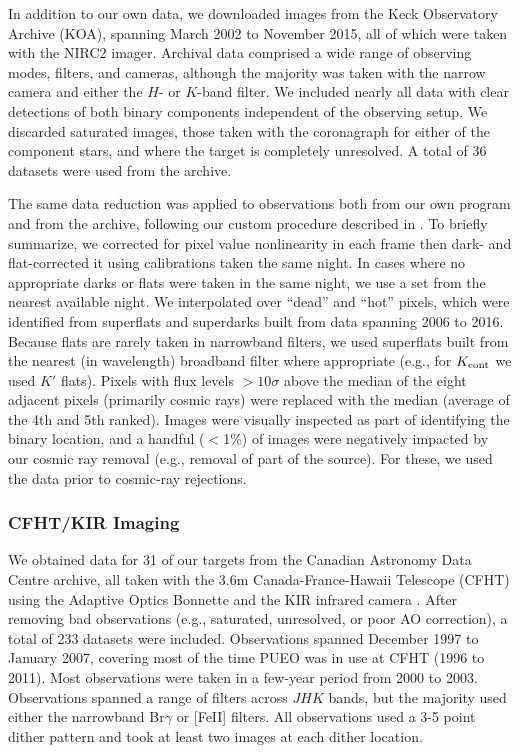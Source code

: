 \documentclass[twocolumn]{aastex62}
\begin{document}
In addition to our own data, we downloaded images from the Keck Observatory Archive (KOA), spanning March 2002 to November 2015, all of which were taken with the NIRC2 imager. Archival data comprised a wide range of observing modes, filters, and cameras, although the majority was taken with the narrow camera and either the $H$- or $K$-band filter. We included nearly all data with clear detections of both binary components independent of the observing setup. We discarded saturated images, those taken with the coronagraph for either of the component stars, and where the target is completely unresolved. A total of 36 datasets were used from the archive. 

The same data reduction was applied to observations both from our own program and from the archive, following our custom procedure described in \citet{Kraus2016a}. To briefly summarize, we corrected for pixel value nonlinearity in each frame then dark- and flat-corrected it using calibrations taken the same night. In cases where no appropriate darks or flats were taken in the same night, we use a set from the nearest available night. We interpolated over ``dead'' and ``hot'' pixels, which were identified from superflats and superdarks built from data spanning 2006 to 2016. Because flats are rarely taken in narrowband filters, we used superflats built from the nearest (in wavelength) broadband filter where appropriate (e.g., for $K_{\rm{cont}}$ we used $K'$ flats). Pixels with flux levels $>10\sigma$ above the median of the eight adjacent pixels (primarily cosmic rays) were replaced with the median (average of the 4th and 5th ranked). Images were visually inspected as part of identifying the binary location, and a handful ($<$1\%) of images were negatively impacted by our cosmic ray removal (e.g., removal of part of the source). For these, we used the data prior to cosmic-ray rejections.

\subsubsection{CFHT/KIR Imaging}

We obtained data for 31 of our targets from the Canadian Astronomy Data Centre archive, all taken with the 3.6m Canada-France-Hawaii Telescope (CFHT) using the Adaptive Optics Bonnette \citep[AOB, often referred to as PUEO after the Hawaiian owl,][]{1994SPIE.2201..833A} and the KIR infrared camera \citep{1998SPIE.3354..760D}. After removing bad observations (e.g., saturated, unresolved, or poor AO correction), a total of 233 datasets were included. Observations spanned December 1997 to January 2007, covering most of the time PUEO was in use at CFHT (1996 to 2011). Most observations were taken in a few-year period from 2000 to 2003. Observations spanned a range of filters across $JHK$ bands, but the majority used either the narrowband Br$\gamma$ or [FeII] filters. All observations used a 3-5 point dither pattern and took at least two images at each dither location. 
\end{document}
